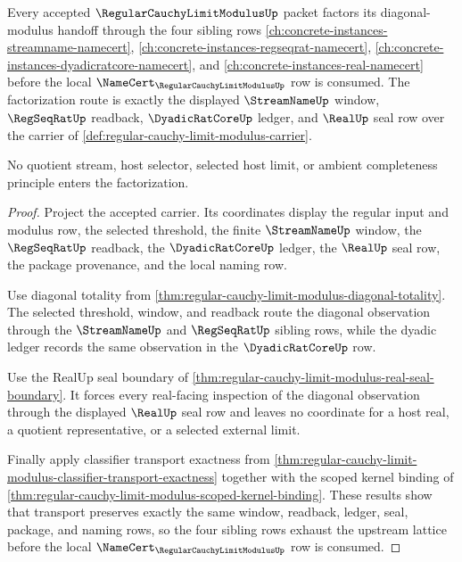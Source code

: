 \begin{theorem}
\label{thm:regular-cauchy-limit-modulus-upstream-lattice-factorization}
Every accepted $\RegularCauchyLimitModulusUp$ packet factors its diagonal-modulus handoff through the four sibling rows \autoref{ch:concrete-instances-streamname-namecert}, \autoref{ch:concrete-instances-regseqrat-namecert}, \autoref{ch:concrete-instances-dyadicratcore-namecert}, and \autoref{ch:concrete-instances-real-namecert} before the local $\NameCert_{\RegularCauchyLimitModulusUp}$ row is consumed. The factorization route is exactly the displayed $\StreamNameUp$ window, $\RegSeqRatUp$ readback, $\DyadicRatCoreUp$ ledger, and $\RealUp$ seal row over the carrier of \autoref{def:regular-cauchy-limit-modulus-carrier}.

No quotient stream, host selector, selected host limit, or ambient completeness principle enters the factorization.
\end{theorem}
\begin{proof}
Project the accepted carrier. Its coordinates display the regular input and modulus row, the selected threshold, the finite $\StreamNameUp$ window, the $\RegSeqRatUp$ readback, the $\DyadicRatCoreUp$ ledger, the $\RealUp$ seal row, the package provenance, and the local naming row.

Use diagonal totality from \autoref{thm:regular-cauchy-limit-modulus-diagonal-totality}. The selected threshold, window, and readback route the diagonal observation through the $\StreamNameUp$ and $\RegSeqRatUp$ sibling rows, while the dyadic ledger records the same observation in the $\DyadicRatCoreUp$ row.

Use the RealUp seal boundary of \autoref{thm:regular-cauchy-limit-modulus-real-seal-boundary}. It forces every real-facing inspection of the diagonal observation through the displayed $\RealUp$ seal row and leaves no coordinate for a host real, a quotient representative, or a selected external limit.

Finally apply classifier transport exactness from \autoref{thm:regular-cauchy-limit-modulus-classifier-transport-exactness} together with the scoped kernel binding of \autoref{thm:regular-cauchy-limit-modulus-scoped-kernel-binding}. These results show that transport preserves exactly the same window, readback, ledger, seal, package, and naming rows, so the four sibling rows exhaust the upstream lattice before the local $\NameCert_{\RegularCauchyLimitModulusUp}$ row is consumed.
\end{proof}

